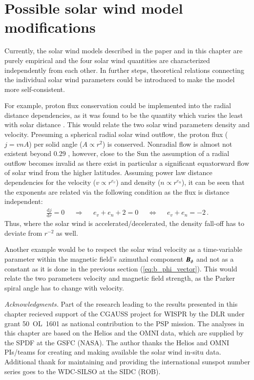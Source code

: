 \section{Possible solar wind model modifications}
\label{sec:possible_solar_wind_model_modifications}
Currently, the solar wind models described in the paper and in this chapter are purely empirical and the four solar wind quantities are characterized independently from each other. In further steps, theoretical relations connecting the individual solar wind parameters could be introduced to make the model more self-consistent.

For example, proton flux conservation could be implemented into the radial distance dependencies, as it was found to be the quantity which varies the least with solar distance \citep{Schwenn1983}. This would relate the two solar wind parameters density and velocity. Presuming a spherical radial solar wind outflow, the proton flux ($j = v n A$) per solid angle ($A \propto r^2$) is conserved. Nonradial flow is almost not existent beyond \SI{0.29}{\au} \citep{Schwenn1983}, however, close to the Sun the assumption of a radial outflow becomes invalid as there exist in particular a significant equatorward flow of solar wind from the higher latitudes. Assuming power law distance dependencies for the velocity ($v \propto r^{e_v}$) and density ($n \propto r^{e_n}$), it can be seen that the exponents are related via the following condition as the flux is distance independent:
\begin{align}
	\frac{\text{d}j}{\text{d}r} = 0	&	&\Rightarrow	&	&e_v + e_n + 2 = 0	&	&\Leftrightarrow	&	&e_v + e_n = -2	\,.	\nonumber
\end{align}
Thus, where the solar wind is accelerated/decelerated, the density fall-off has to deviate from $r^{-2}$ as well.

Another example would be to respect the solar wind velocity as a time-variable parameter within the magnetic field's azimuthal component $\boldsymbol{B}_\phi$ and not as a constant as it is done in the previous section (\autoref{eq:b_phi_vector}). This would relate the two parameters velocity and magnetic field strength, as the Parker spiral angle has to change with velocity.


\bigskip
{\small
\noindent \textit{Acknowledgments.} Part of the research leading to the results presented in this chapter recieved support of the CGAUSS project for WISPR by the DLR under grant 50~OL~1601 as national contribution to the PSP mission.
The analyses in this chapter are based on the Helios and the OMNI data, which are supplied by the SPDF at the GSFC (NASA). The author thanks the Helios and OMNI PIs/teams for creating and making available the solar wind in-situ data. Additional thank for maintaining and providing the international sunspot number series goes to the WDC-SILSO at the SIDC (ROB).
}


\cleardoublepage


